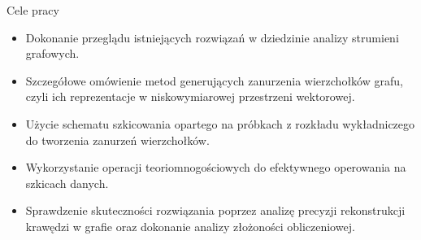 \begin{frame}[squeeze]{Cele pracy}
    \begin{itemize}
        \setlength\itemsep{0.6em}
        \item Dokonanie przeglądu istniejących rozwiązań w dziedzinie analizy strumieni grafowych.
        \item Szczegółowe omówienie metod generujących zanurzenia wierzchołków grafu, czyli ich reprezentacje w niskowymiarowej przestrzeni wektorowej. 
        \item Użycie schematu szkicowania opartego na próbkach z rozkładu wykładniczego do tworzenia zanurzeń wierzchołków.
        \item Wykorzystanie operacji teoriomnogościowych do efektywnego operowania na szkicach danych.
        \item Sprawdzenie skuteczności rozwiązania poprzez analizę precyzji rekonstrukcji krawędzi w grafie oraz dokonanie analizy złożoności obliczeniowej.
    \end{itemize}
\end{frame}